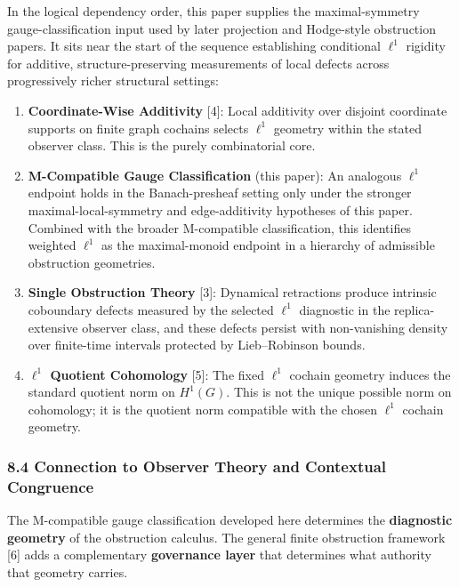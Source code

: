 \documentclass[
  11pt,
]{article}
\providecommand{\tightlist}{%
  \setlength{\itemsep}{0pt}\setlength{\parskip}{0pt}}
\providecommand{\tightlist}{%
  \setlength{\itemsep}{0pt}\setlength{\parskip}{0pt}}
\begin{document}
In the logical dependency order, this paper supplies the maximal-symmetry gauge-classification input used by later projection and Hodge-style obstruction papers. It sits near the start of the sequence establishing conditional \(\ell^1\) rigidity for additive, structure-preserving measurements of local defects across progressively richer structural settings:

\begin{enumerate}
\def\labelenumi{\arabic{enumi}.}
\tightlist
\item
  \textbf{Coordinate-Wise Additivity} {[}4{]}: Local additivity over disjoint coordinate supports on finite graph cochains selects \(\ell^1\) geometry within the stated observer class. This is the purely combinatorial core.
\item
  \textbf{M-Compatible Gauge Classification} (this paper): An analogous \(\ell^1\) endpoint holds in the Banach-presheaf setting only under the stronger maximal-local-symmetry and edge-additivity hypotheses of this paper. Combined with the broader M-compatible classification, this identifies weighted \(\ell^1\) as the maximal-monoid endpoint in a hierarchy of admissible obstruction geometries.
\item
  \textbf{Single Obstruction Theory} {[}3{]}: Dynamical retractions produce intrinsic coboundary defects measured by the selected \(\ell^1\) diagnostic in the replica-extensive observer class, and these defects persist with non-vanishing density over finite-time intervals protected by Lieb--Robinson bounds.
\item
  \textbf{\(\ell^1\) Quotient Cohomology} {[}5{]}: The fixed \(\ell^1\) cochain geometry induces the standard quotient norm on \(H^1(G)\). This is not the unique possible norm on cohomology; it is the quotient norm compatible with the chosen \(\ell^1\) cochain geometry.
\end{enumerate}

\subsubsection{8.4 Connection to Observer Theory and Contextual Congruence}\label{connection-to-observer-theory-and-contextual-congruence}

The M-compatible gauge classification developed here determines the \textbf{diagnostic geometry} of the obstruction calculus. The general finite obstruction framework {[}6{]} adds a complementary \textbf{governance layer} that determines what authority that geometry carries.
\end{document}
